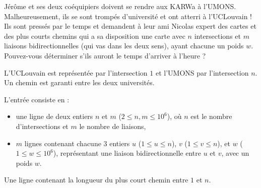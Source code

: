\problemname{\problemyamlname}



Jérôme et ses deux coéquipiers doivent se rendre aux KARWa à l'UMONS.
Malheureusement, ils se sont trompés d'université et ont atterri à l'UCLouvain !
Ils sont pressés par le temps et demandent à leur ami Nicolas expert des cartes et des plus courts chemins qui a sa disposition une carte avec $n$ intersections et $m$ liaisons bidirectionnelles (qui vas dans les deux sens), ayant chacune un poids $w$.
Pouvez-vous déterminer s'ils auront le temps d'arriver à l'heure ?

L'UCLouvain est représentée par l'intersection $1$ et l'UMONS par l'intersection $n$.
Un chemin est garanti entre les deux universités.

\begin{Input}
	L'entrée consiste en :
	\begin{itemize}
		\item une ligne de deux entiers $n$ et $m$ ($2 \le n, m \le 10^6$), où $n$ est le nombre d'intersections et $m$ le nombre de liaisons,
		\item $m$ lignes contenant chacune 3 entiers $u$ ($1 \le u \le n$), $v$ ($1 \le v \le n$), et $w$ ($1 \le w \le 10^6$), représentant une liaison bidirectionnelle entre $u$ et $v$, avec un poids $w$.
	\end{itemize}
\end{Input}

\begin{Output}
	Une ligne contenant la longueur du plus court chemin entre $1$ et $n$.
\end{Output}
